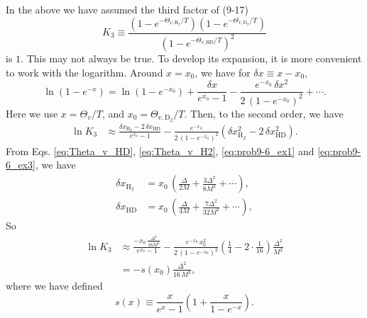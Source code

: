 \documentclass[twocolumn, 10pt]{article}
\numberwithin{equation}{section}
\newenvironment{solution}[1][\empty]
{\par\medskip\sffamily
  \textbf{\ifx\empty#1{Solution.}\relax\else{#1}\fi} \ignorespaces}
{\medskip}
\begin{document}
\begin{solution}
  In the above we have assumed the third factor of (9-17)
  $$
    K_3
    \equiv
    \frac{
      \left( 1 - e^{-\Theta_{v,\mathrm{H}_2}/T} \right)
      \left( 1 - e^{-\Theta_{v,\mathrm{D}_2}/T} \right)
    } {
      \left( 1 - e^{-\Theta_{v,\mathrm{HD}}/T} \right)^2
    }
  $$
  is $1$.
  This may not always be true.
  To develop its expansion, it is more convenient to work
  with the logarithm.
  Around $x = x_0$, we have for $\delta x \equiv x - x_0$,
  $$
  \ln(1 - e^{-x})
  =
  \ln(1 - e^{-x_0})
  +
  \frac{\delta x}{e^{x_0} - 1}
  -
  \frac{e^{-x_0} \, \delta x^2 }
  { 2 \, (1 - e^{-x_0})^2 }
  + \cdots.
  $$
  Here we use $x = \Theta_v/T$,
  and $x_0 = \Theta_{v,\mathrm{D}_2}/T$.
  Then, to the second order, we have
  \begin{align*}
    \ln K_3
    &\approx
    \frac{
      \delta x_{\mathrm{H_2}}
      -
      2 \,  \delta x_{\mathrm{HD}}
    } { e^{x_0} - 1 }
    -\frac{ e^{-x_0} }
    {2 \, (1 - e^{-x_0})^2 }
    \left(
    \delta x_{\mathrm{H_2}}^2
    -2 \, \delta x_{\mathrm{HD}}^2
    \right)
    .
  \end{align*}
  From Eqs.
  \eqref{eq:Theta_v_HD}, \eqref{eq:Theta_v_H2},
  \eqref{eq:prob9-6_ex1} and \eqref{eq:prob9-6_ex3},
  we have
  \begin{align*}
    \delta x_{\mathrm{H_2}}
    &=
    x_0 \, \left(\frac{\Delta}{2M}
    + \frac{3\Delta^2}{8M^2} + \cdots \right)
    ,
    \\
    \delta x_{\mathrm{HD}}
    &=
    x_0 \, \left(\frac{\Delta}{4M}
    + \frac{7\Delta^2}{32M^2} + \cdots \right)
    ,
  \end{align*}
  So
  \begin{align*}
    \ln K_3
    &\approx
    \frac{
      -x_0
      \,
      \frac{\Delta^2}{16 M^2}
    } { e^{x_0} - 1 }
    -\frac{ e^{-x_0} \, x_0^2 }
    {2 \, (1 - e^{-x_0})^2 }
    \left(
    \frac{1}{4}
    -2 \cdot \frac{1}{16}
    \right)
    \frac{\Delta^2}{M^2}
    \\
    &=
    -
    s(x_0)
    \frac{\Delta^2}{16 \, M^2}
    ,
  \end{align*}
  where we have defined
  $$
    s(x)
    \equiv
    \frac{ x } { e^{x} - 1 }
    \left(
      1 +\frac{ x } {1 - e^{-x} }
    \right).
  $$
  \begin{figure}[h]\centering
  \end{figure}


\end{solution}
\end{document}
